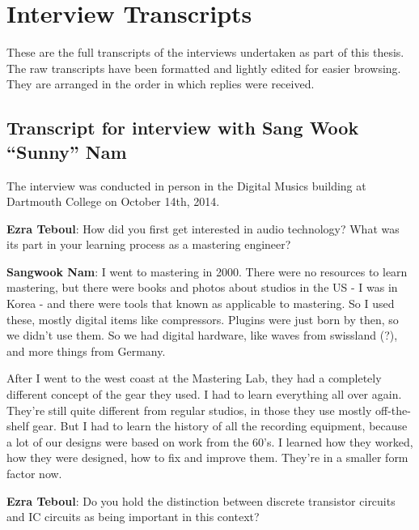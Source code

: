 
\chapter{Interview Transcripts}\label{app:inttrans} %


These are the full transcripts of the interviews undertaken as part of this thesis. The raw transcripts have been formatted and lightly edited for easier browsing. They are arranged in the order in which replies were received.  

\clearpage 
\section{Transcript for interview with Sang Wook ``Sunny'' Nam}

The interview was conducted in person in the Digital Musics building at Dartmouth College on October 14th, 2014. 

\textbf{Ezra Teboul}: How did you first get interested in audio technology? What was its part in your learning process as a mastering engineer?

\textbf{Sangwook Nam}: I went to mastering in 2000. There were no resources to learn mastering, but there were books and photos about studios in the US - I was in Korea - and there were tools that known as applicable to mastering. So I used these, mostly digital items like compressors. Plugins were just born by then, so we didn't use them. So we had digital hardware, like waves from swissland (?), and more things from Germany.

After I went to the west coast at the Mastering Lab, they had a completely different concept of the gear they used. I had to learn everything all over again. They're still quite different from regular studios, in those they use mostly off-the-shelf gear. But I had to learn the history of all the recording equipment, because a lot of our designs were based on work from the 60's. I learned how they worked, how they were designed, how to fix and improve them. They're in a smaller form factor now.

\textbf{Ezra Teboul}: Do you hold the distinction between discrete transistor circuits and IC circuits as being important in this context?

